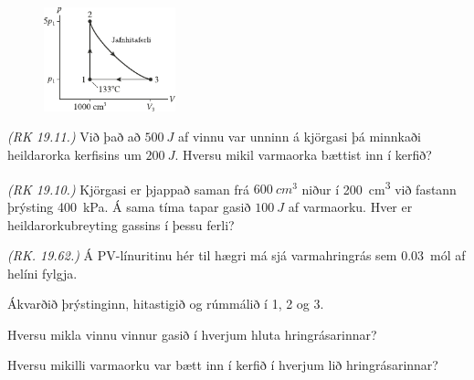 \ifdefined \wholebook \else\documentclass[oneside]{book}\usepackage{EdlBook}\graphicspath{{figures/}}
\begin{document}
\begin{enumerate}[label = \textbf{Dæmi \thechapter.\arabic*.}]

\setcounter{enumi}{13}


\begin{minipage}{\linewidth}

\begin{figure}
\hspace{0.5cm}
\includegraphics[width = 1.5in]{figures/pV-dia.pdf}

\end{figure}

\item \textit{(RK 19.11.)} Við það að $\SI{500}{J}$ af vinnu var unninn á kjörgasi þá minnkaði heildarorka kerfisins um $\SI{200}{J}$. Hversu mikil varmaorka bættist inn í kerfið?

\item \textit{(RK 19.10.)} Kjörgasi er þjappað saman frá $\SI{600}{cm^3}$ niður í \SI{200}{cm^3} við fastann þrýsting \SI{400}{kPa}. Á sama tíma tapar gasið $\SI{100}{J}$ af varmaorku. Hver er heildarorkubreyting gassins í þessu ferli?

\item \textit{(RK. 19.62.)} Á PV-línuritinu hér til hægri má sjá varmahringrás sem \SI{0.03}{mól} af helíni fylgja. \begin{enumerate*}[label =\textbf{(\alph*)}]
    \item Ákvarðið þrýstinginn, hitastigið og rúmmálið í 1, 2 og 3.
    \item Hversu mikla vinnu vinnur gasið í hverjum hluta hringrásarinnar?
    \item Hversu mikilli varmaorku var bætt inn í kerfið í hverjum lið hringrásarinnar?
\end{enumerate*}


\end{minipage}
\end{enumerate}
\end{document}
